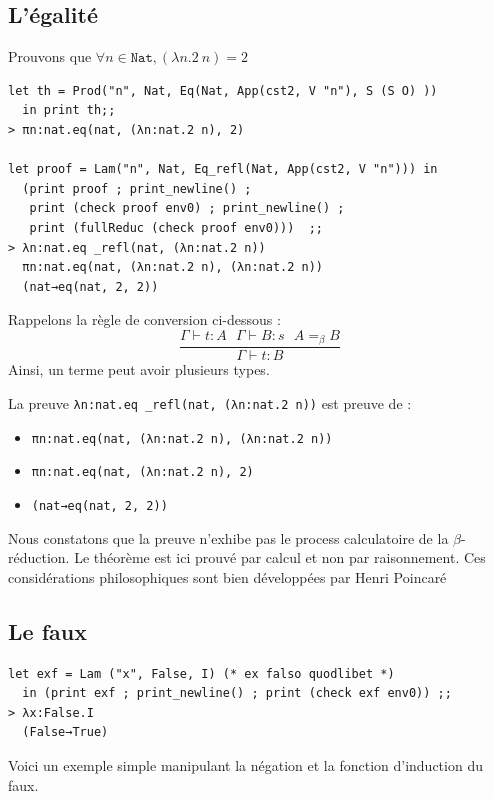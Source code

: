 \documentclass[11pt]{book}
\begin{document}
\subsection{L'égalité}
Prouvons que $\forall n \in \mathtt{Nat}, (\lambda n.2\  n) = 2$
\begin{Verbatim}
let th = Prod("n", Nat, Eq(Nat, App(cst2, V "n"), S (S O) )) 
  in print th;;
> πn:nat.eq(nat, (λn:nat.2 n), 2)

let proof = Lam("n", Nat, Eq_refl(Nat, App(cst2, V "n"))) in 
  (print proof ; print_newline() ;
   print (check proof env0) ; print_newline() ; 
   print (fullReduc (check proof env0)))  ;;
> λn:nat.eq _refl(nat, (λn:nat.2 n))
  πn:nat.eq(nat, (λn:nat.2 n), (λn:nat.2 n))
  (nat→eq(nat, 2, 2))
\end{Verbatim}
Rappelons la règle de conversion ci-dessous :
$$
\frac{\Gamma ⊢ t:A \ \ \     \Gamma ⊢ B:s \ \ \     A=_\beta B}{\Gamma ⊢ t:B}
$$
Ainsi, un terme peut avoir plusieurs types.

\noindent La preuve \verb+λn:nat.eq _refl(nat, (λn:nat.2 n))+ est preuve de :
\begin{itemize}
 \item \verb+πn:nat.eq(nat, (λn:nat.2 n), (λn:nat.2 n))+
 \item \verb+πn:nat.eq(nat, (λn:nat.2 n), 2)+
 \item \verb+(nat→eq(nat, 2, 2))+
\end{itemize}
Nous constatons que la preuve n'exhibe pas le process calculatoire de la $\beta$-réduction.
Le théorème est ici prouvé par calcul et non par raisonnement. Ces considérations philosophiques sont bien développées
par Henri Poincaré\cite{poincare}

\subsection{Le faux}

\begin{Verbatim}
let exf = Lam ("x", False, I) (* ex falso quodlibet *)
  in (print exf ; print_newline() ; print (check exf env0)) ;;
> λx:False.I
  (False→True) 
\end{Verbatim}
Voici un exemple simple manipulant la négation et la fonction d'induction du faux.
\end{document}
